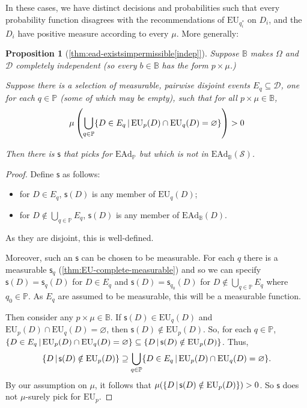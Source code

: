 \documentclass[a4paper]{article}
\newtheorem{proposition}[theorem]{Proposition}
\renewcommand\P{\mathbb{P}} %
\newcommand\EU{\mathrm{EU}}
\newcommand\EAd{\mathrm{EAd}}
\newcommand{\Decs}{\mathcal{D}}
\renewcommand\S{\mathcal{S}}
\newcommand\s{\mathsf{s}}
\newcommand{\IB}{\mathbb{B}}
\newcommand{\IP}{\P}
\renewcommand{\color}[1]{}
\newenvironment{colored}[1]{\leavevmode\color{#1}}{}
\newcommand\SetDelimiter[1][]{
	\nonscript\,#1\vert \allowbreak \nonscript\,\mathopen{}}
\providecommand\given{\SetDelimiter}
\renewcommand{\emptyset}{\varnothing}
\newenvironment{CCM rewritten}
{\begingroup\color{blue}} %
{\endgroup}              %
\begin{document}
In these cases, we have distinct decisions and probabilities such that every probability function disagrees with the recommendations of $\EU_{q^*_i}$ on $D_i$, and the $D_i$ have positive measure according to every $\mu$. More generally:
\begin{proposition}[\cref{thm:ead-existsimpermissible[indep]}]

Suppose $\IB$ makes $\Omega$ and $\Decs$ completely independent (so every $b\in\IB$ has the form $p\times\mu$.)

Suppose there is a selection of measurable, pairwise disjoint events $E_q\subseteq\Decs$, one for each $q\in\IP$ (some of which may be empty), such that for all $p\times\mu\in\IB$, 
\[
\mu\left(\bigcup_{q\in\IP}\{D\in E_q\given \EU_p(D)\cap\EU_q(D)=\emptyset\}\right)>0
\]

Then there is $\s$ that picks for $\EAd_\IP$ but which is not in $\EAd_\IB(\S)$. 
\end{proposition}
\begin{proof}
	Define $\s$ as follows:
	\begin{itemize}
	\item for $D \in E_q$, $\s(D)$ is any member of  $\EU_q(D)$; 
	\item for $D\notin \bigcup_{q\in\IP}E_q$, $\s(D)$ is any member of $\EAd_\IB(D)$.
	\end{itemize} 
	
	As they are disjoint, this is well-defined. 
	
	\begin{colored}{violet}
		Moreover, such an $\s$ can be chosen to be measurable. For each $q$ there is a measurable $\s_q$ (\cref{thm:EU-complete-measurable}) and so we can specify $\s(D)=\s_q(D)$ for $D\in E_q$ and $\s(D)=\s_{q_0}(D)$ for $D\notin \bigcup_{q\in\IP}E_q$ where $q_0\in\IP$. As $E_q$ are assumed to be measurable, this will be a measurable function. 
	\end{colored}
	
	Then consider any $p \times \mu\in\IB$. 
	If $\s(D)\in\EU_q(D)$ and $\EU_p(D)\cap\EU_q(D)=\emptyset$, then $\s(D)\notin\EU_p(D)$. 
		So, for each $q\in\IP$, $\{D\in E_q\given \EU_p(D)\cap\EU_q(D)=\emptyset\}\subseteq\{D\given \s(D)\notin\EU_p(D)\}$. Thus, $$\{D\given \s(D)\notin\EU_p(D)\}\supseteq\bigcup_{q\in\IP}\{D\in E_q\given \EU_p(D)\cap\EU_q(D)=\emptyset\}.$$ By our assumption on $\mu$, it follows that $\mu(\{D\given \s(D)\notin\EU_p(D)\})>0$. So $\s$ does not $\mu$-surely pick for $\EU_p$. 
\end{proof}
\end{document}
